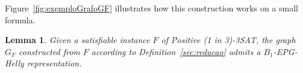 \documentclass[9pt]{entcs}
\newtheorem{lema}{Lemma}[section]
\newtheorem{prove}{Proof}[section]
\begin{document}
Figure~\ref{fig:exemploGrafoGF} illustrates how this construction works on a small formula. %





\begin{lema}\label{lem:ida}
Given a satisfiable instance $F$ of {\sc Positive (1 in 3)-3SAT}, the graph $G_F$ constructed from $F$ according to Definition~\ref{sec:reducao} admits a $B_{1}$-EPG-Helly representation.
\end{lema}





% 


% 



% 


\end{document}
